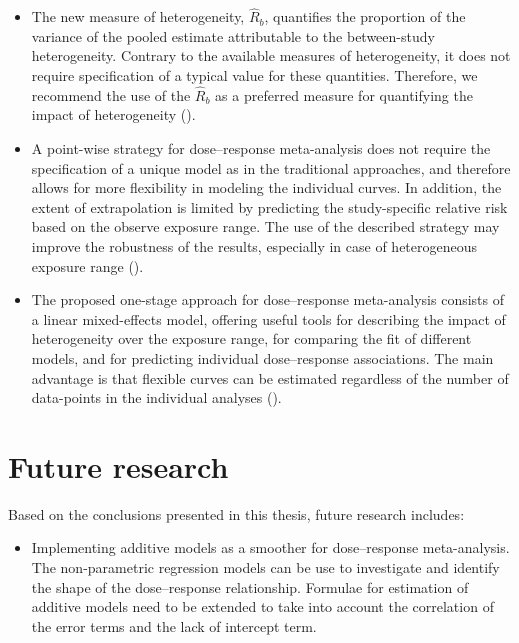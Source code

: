 \documentclass[11pt,a4paper,twoside,openany]{book}\usepackage{knitr}
\begin{document}
{{\begin{itemize}
\item The new measure of heterogeneity, $\hat R_b$, quantifies the proportion of the variance of the pooled estimate attributable to the between-study heterogeneity. Contrary to the available measures of heterogeneity, it does not require specification of a typical value for these quantities. Therefore, we recommend the use of the $\hat R_b$ as a preferred measure for quantifying the impact of heterogeneity (). 

\item A point-wise strategy for dose--response meta-analysis does not require the specification of a unique model as in the traditional approaches, and therefore allows for more flexibility in modeling the individual curves. In addition, the extent of extrapolation is limited by predicting the study-specific relative risk based on the observe exposure range. The use of the described strategy may improve the robustness of the results, especially in case of heterogeneous exposure range ().

\item The proposed one-stage approach for dose--response meta-analysis consists of a linear mixed-effects model, offering useful tools for describing the impact of heterogeneity over the exposure range, for comparing the fit of different models, and for predicting individual dose--response associations. The main advantage is that flexible curves can be estimated regardless of the number of data-points in the individual analyses ().

\end{itemize}


%

\chapter{Future research}

Based on the conclusions presented in this thesis, future research includes: 

\begin{itemize}
\item Implementing additive models as a smoother for dose--response meta-analysis. The non-parametric regression models can be use to investigate and identify the shape of the dose--response relationship. Formulae for estimation of additive models need to be extended to take into account the correlation of the error terms and the lack of intercept term.


\end{itemize}}}
\end{document}
